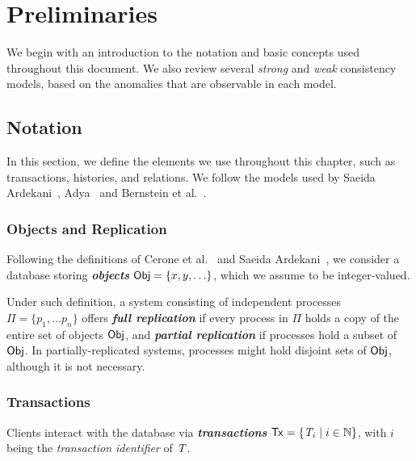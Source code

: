\cleardoublepage
\chapter{Preliminaries}
\label{chapter:preliminaries}

We begin with an introduction to the notation and basic concepts used throughout this document. We also review several \emph{strong} and \emph{weak} consistency models, based on the anomalies that are observable in each model.

\section{Notation}
\label{sect:notation}

In this section, we define the elements we use throughout this chapter, such as transactions, histories, and relations. We follow the models used by Saeida Ardekani~\citep{ardekani_thesis}, Adya~\citep{adya_thesis} and Bernstein et al.~\citep{bernstein_concurrency}.

\subsection{Objects and Replication}
\label{sect:objects}

Following the definitions of Cerone et al.~\citep{concur_framework} and Saeida Ardekani~\citep{ardekani_thesis}, we consider a database storing \textbf{\em objects} ${\sf Obj} = \{x, y, \ldots\}$, which we assume to be integer-valued.

Under such definition, a system consisting of independent processes $\Pi = \{p_1, \ldots p_n\}$ offers \textbf{\em full replication} if every process in $\Pi$ holds a copy of the entire set of objects ${\sf Obj}$, and \textbf{\em partial replication} if processes hold a subset of ${\sf Obj}$. In partially-replicated systems, processes might hold disjoint sets of ${\sf Obj}$, although it is not necessary.

\subsection{Transactions}
\label{sect:transactions}

Clients interact with the database via \textbf{\em transactions} ${\sf Tx} = \{\mathit{T}_i \mid i \in \mathbb{N}\}$, with $i$ being the \emph{transaction identifier} of $\mathit{T}$.

